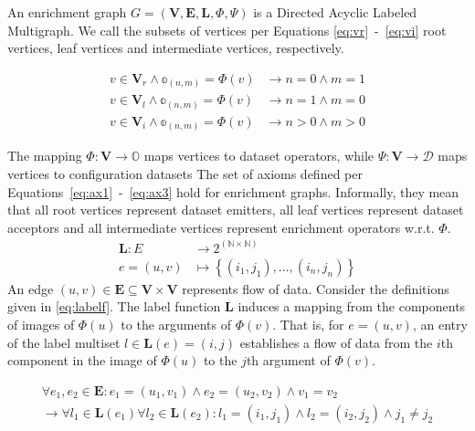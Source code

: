 An enrichment graph $G=(\mathbf{V},\mathbf{E},\mathbf{L},\Phi,\Psi)$ is a Directed Acyclic Labeled Multigraph.
We call the subsets of vertices per Equations \ref{eq:vr}~-~\ref{eq:vi} root vertices, leaf vertices and intermediate vertices, respectively.

\begin{align}
v \in \mathbf{V}_r \land \mathbb{o}_{(n,m)} = \Phi(v) & \to n = 0 \land m = 1 \label{eq:ax1} \\
v \in \mathbf{V}_l \land \mathbb{o}_{(n,m)} = \Phi(v) & \to n = 1 \land m = 0 \label{eq:ax2} \\
v \in \mathbf{V}_i \land \mathbb{o}_{(n,m)} = \Phi(v) & \to n > 0 \land m > 0 \label{eq:ax3}
\end{align}

The mapping $\Phi\colon \mathbf{V} \to \mathbb{O}$ maps vertices to dataset operators, while $\Psi\colon \mathbf{V} \to \mathcal{D}$ maps vertices to configuration datasets
The set of axioms defined per Equations~\ref{eq:ax1}~-~\ref{eq:ax3} hold for enrichment graphs.
Informally, they mean that all root vertices represent dataset emitters, all leaf vertices represent dataset acceptors and all intermediate vertices represent enrichment operators w.r.t. $\Phi$.\\

\begin{equation}
\begin{aligned}
  \mathbf{L}\colon E & \to 2^{(\mathbb{N} \times \mathbb{N})} \\
  e = (u,v) & \mapsto \left\{ (i_1, j_1), \dots, (i_n, j_n) \right\}
\end{aligned}
\label{eq:labelf}
\end{equation}
An edge $(u, v) \in \mathbf{E} \subseteq \mathbf{V} \times \mathbf{V} $ represents flow of data. Consider the definitions given in \autoref{eq:labelf}. The label function $\mathbf{L}$ induces a mapping from the components of images of $\Phi(u)$ to the arguments of $\Phi(v)$. That is, for $e=(u,v)$, an entry of the label multiset $l\in \mathbf{L}(e) = (i, j)$ establishes a flow of data from the $i$th component in the image of $\Phi(u)$ to the $j$th argument of $\Phi(v)$.

\begin{equation}
  \begin{aligned}
    \forall e_1, e_2 \in \mathbf{E} \colon e_1=(u_1,v_1) \land e_2=(u_2,v_2) \land v_1 = v_2\\ \to
    \forall l_1 \in \mathbf{L}(e_1) \forall l_2 \in \mathbf{L}(e_2) \colon l_1 = (i_1, j_1) \land l_2 = (i_2, j_2) \land j_1\neq j_2
  \end{aligned}
  \label{eq:labelcrit}
\end{equation}

